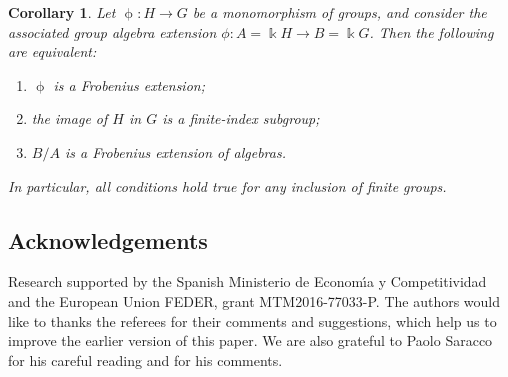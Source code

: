 \documentclass[10pt,a4paper]{amsart}
\numberwithin{equation}{section}
\newtheorem{Corollary}[Theorem]{Corollary}
\begin{document}
\begin{Corollary}\label{cor:FiniteI}Let $\upphi\colon H \to G$ be a monomorphism of groups, and consider the associated group algebra extension $\phi\colon A=\Bbbk H \to B=\Bbbk G$. Then the following are equivalent:
\begin{enumerate}[$1)$]\itemsep=0pt
\item $\upphi$ is a Frobenius extension;
\item the image of $H$ in $G$ is a finite-index subgroup;
\item $B/A$ is a Frobenius extension of algebras.
\end{enumerate}
In particular, all conditions hold true for any inclusion of finite groups.
\end{Corollary}


\subsection*{Acknowledgements}
Research supported by the Spanish Ministerio de Econom\'{\i}a y Competitividad and the European Union FEDER, grant MTM2016-77033-P.
The authors would like to thanks the referees for their comments and suggestions, which help us to improve the earlier version of this paper. We are also grateful to Paolo Saracco for his careful reading and for his comments.

\end{document}
